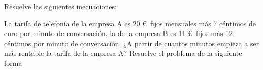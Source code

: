 \documentclass[addpoints,spanish, 12pt,a4paper]{exam}
\begin{document}
\begin{questions}
\question Resuelve las siguientes inecuaciones:
\begin{parts}

\part[1]$ x^{2} - x - 2 \geq 0  $  
\begin{solution} $ \left(-\infty, -1\right] \cup \left[2, \infty\right)$ \end{solution}

\part[2]$x^{4} - x^{3} + 2 x^{2} - 8 x < 0$  
\begin{solution} $\left(0, 2\right)$ \end{solution}

\part[2]$\dfrac{x^{2} - 1}{x^{3} + 2 x^{2} + x}\geqslant 0$  
\begin{solution} $\dfrac{\left(x-1\right)\left(x+1\right)}{x\left(x+1\right)^2}\to\left(-1, 0\right) \cup \left[1, \infty\right)$ \end{solution}

\part[2]  $\left| {2x - 12} \right| > 2$ 
\begin{solution} $\left(-\infty, 5\right) \cup \left(7, \infty\right) $ \end{solution}

\end{parts}

\addpoints
\question La tarifa de  telefonía de la empresa A es 20 \euro\ fijos mensuales más 7 céntimos de euro por minuto de conversación, la de la empresa B es 11 \euro\ fijos más 12 céntimos por minuto de conversación. ¿A partir de cuantos minutos empieza a ser más rentable la tarifa de la empresa A? Resuelve el problema de la siguiente forma
\begin{parts} 

\end{parts}
\end{questions}
\end{document}
